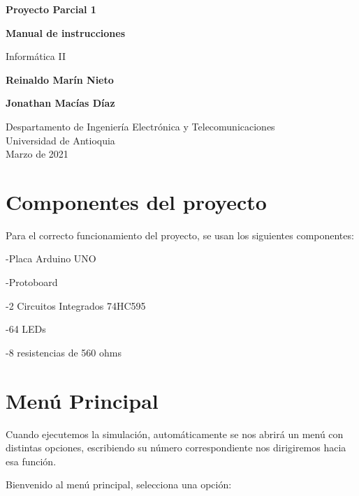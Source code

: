 \documentclass{article}
\begin{document}
\begin{titlepage}
    \begin{center}
        \vspace*{1cm}
            
        \Huge
        \textbf{Proyecto Parcial 1}
        
        \textbf{Manual de instrucciones}
            
        \vspace{0.5cm}
        \LARGE
        Informática II
            
        \vspace{1.5cm}
            
        \textbf{Reinaldo Marín Nieto}


        \textbf{Jonathan Macías Díaz}
            
        \vfill
            
        \vspace{0.8cm}
            
        \Large
        Despartamento de Ingeniería Electrónica y Telecomunicaciones\\
        Universidad de Antioquia\\
        Marzo de 2021
            
    \end{center}
\end{titlepage}

\tableofcontents
\newpage
\section{Componentes del proyecto}\label{intro}
Para el correcto funcionamiento del proyecto, se usan los siguientes componentes:


-Placa Arduino UNO


-Protoboard


-2 Circuitos Integrados 74HC595


-64 LEDs


-8 resistencias de 560 ohms

\section{Menú Principal} 
Cuando ejecutemos la simulación, automáticamente se nos abrirá un menú con distintas opciones, escribiendo su número correspondiente nos dirigiremos hacia esa función.

Bienvenido al menú principal, selecciona una opción:
\end{document}
